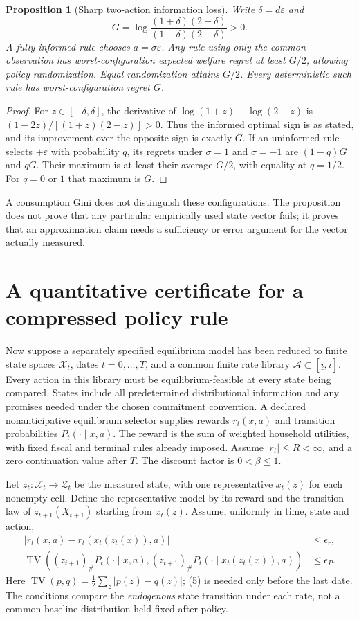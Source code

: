 \documentclass[11pt]{article}
\newtheorem{proposition}[theorem]{Proposition}
\theoremstyle{remark}
\newcommand{\TV}{\operatorname{TV}}
\begin{document}
\begin{proposition}[Sharp two-action information loss]
Write $\delta=d\varepsilon$ and
\[
 G=\log\frac{(1+\delta)(2-\delta)}{(1-\delta)(2+\delta)}>0.
\]
A fully informed rule chooses $a=\sigma\varepsilon$. Any rule using only
the common observation has worst-configuration expected welfare regret
at least $G/2$, allowing policy randomization. Equal randomization attains
$G/2$. Every deterministic such rule has worst-configuration regret $G$.
\end{proposition}
\begin{proof}
For $z\in[-\delta,\delta]$, the derivative of
$\log(1+z)+\log(2-z)$ is
$(1-2z)/[(1+z)(2-z)]>0$. Thus the informed optimal sign is as stated,
and its improvement over the opposite sign is exactly $G$.
If an uninformed rule selects $+\varepsilon$ with probability $q$, its
regrets under $\sigma=1$ and $\sigma=-1$ are $(1-q)G$ and $qG$.
Their maximum is at least their average $G/2$, with equality at $q=1/2$.
For $q=0$ or $1$ that maximum is $G$.
\end{proof}
A consumption Gini does not distinguish these configurations. The
proposition does not prove that any particular empirically used state
vector fails; it proves that an approximation claim needs a sufficiency
or error argument for the vector actually measured.

\section{A quantitative certificate for a compressed policy rule}
Now suppose a separately specified equilibrium model has been reduced to
finite state spaces $\mathcal X_t$, dates $t=0,\ldots,T$, and a common finite
rate library $\mathcal A\subset[\underline i,\overline i]$. Every action in
this library must be equilibrium-feasible at every state being compared.
States include all predetermined distributional information and any
promises needed under the chosen commitment convention. A declared
nonanticipative equilibrium selector supplies rewards $r_t(x,a)$ and
transition probabilities $P_t(\cdot\mid x,a)$. The reward is the sum of
weighted household utilities, with fixed fiscal and terminal rules already
imposed. Assume $|r_t|\leq R<\infty$, and a zero continuation value after
$T$. The discount factor is $0<\beta\leq1$.

Let $z_t:\mathcal X_t\to\mathcal Z_t$ be the measured state, with one
representative $x_t(z)$ for each nonempty cell. Define the representative
model by its reward and the transition law of $z_{t+1}(X_{t+1})$ starting
from $x_t(z)$. Assume, uniformly in time, state and action,
\begin{align}
 |r_t(x,a)-r_t(x_t(z_t(x)),a)|&\leq\epsilon_r,\tag{4}\\
 \TV\left((z_{t+1})_\#P_t(\cdot\mid x,a),
 (z_{t+1})_\#P_t(\cdot\mid x_t(z_t(x)),a)\right)&\leq\epsilon_P.
 \tag{5}
\end{align}
Here $\TV(p,q)=\frac12\sum_z|p(z)-q(z)|$; (5) is needed only before the
last date. The conditions compare the \emph{endogenous} state transition
under each rate, not a common baseline distribution held fixed after policy.
\end{document}

